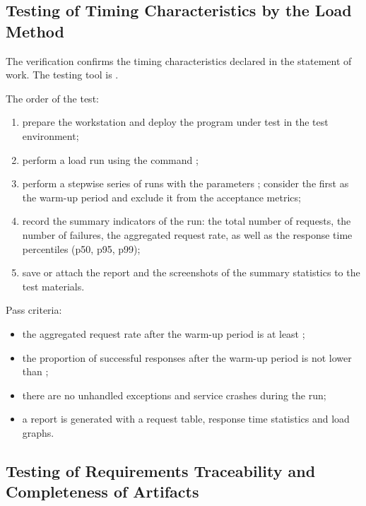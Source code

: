 \documentclass[12pt,a4paper]{extarticle}
\begin{document}
\subsection{Testing of Timing Characteristics by the Load Method}

\begin{hseExample}
The verification confirms the timing characteristics declared in the statement of work. The testing tool is .

The order of the test:
\begin{enumerate}[label=\arabic*), leftmargin=1.25cm]
    \item prepare the workstation and deploy the program under test in the test environment;
    \item perform a load run using the command ;
    \item perform a stepwise series of runs with the parameters ; consider the first  as the warm-up period and exclude it from the acceptance metrics;
    \item record the summary indicators of the run: the total number of requests, the number of failures, the aggregated request rate, as well as the response time percentiles (p50, p95, p99);
    \item save or attach the report and the screenshots of the summary statistics to the test materials.
\end{enumerate}

Pass criteria:
\begin{itemize}[nosep, leftmargin=1.25cm]
    \item the aggregated request rate after the warm-up period is at least ;
    \item the proportion of successful responses after the warm-up period is not lower than ;
    \item there are no unhandled exceptions and service crashes during the run;
    \item a report is generated with a request table, response time statistics and load graphs.
\end{itemize}
\end{hseExample}

\subsection{Testing of Requirements Traceability and Completeness of Artifacts}
\end{document}
